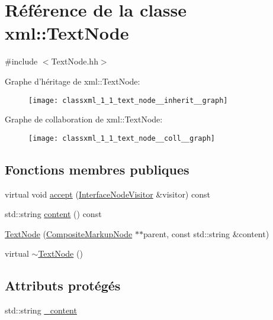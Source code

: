 \hypertarget{classxml_1_1_text_node}{
\section{Référence de la classe xml::TextNode}
\label{classxml_1_1_text_node}
}


{\ttfamily \#include $<$TextNode.hh$>$}



Graphe d'héritage de xml::TextNode:\nopagebreak
\begin{figure}[H]
\begin{center}
\leavevmode
\texttt{[image: classxml\_1\_1\_text\_node\_\_inherit\_\_graph]}
\end{center}
\end{figure}


Graphe de collaboration de xml::TextNode:\nopagebreak
\begin{figure}[H]
\begin{center}
\leavevmode
\texttt{[image: classxml\_1\_1\_text\_node\_\_coll\_\_graph]}
\end{center}
\end{figure}
\subsection*{Fonctions membres publiques}
\begin{DoxyCompactItemize}
\item 
virtual void \hyperlink{classxml_1_1_text_node_ac918f8f74e141690e18cd8e23d174996}{accept} (\hyperlink{classxml_1_1_interface_node_visitor}{InterfaceNodeVisitor} \&visitor) const 
\item 
std::string \hyperlink{classxml_1_1_text_node_a25941b48615a65258cc17d85bc0691d1}{content} () const 
\item 
\hyperlink{classxml_1_1_text_node_aa792bfa28288ba0b52f38215acb1feb0}{TextNode} (\hyperlink{classxml_1_1_composite_markup_node}{CompositeMarkupNode} $\ast$$\ast$parent, const std::string \&content)
\item 
virtual \hyperlink{classxml_1_1_text_node_a631efcd9de6889ba2b8f31e578267d29}{$\sim$TextNode} ()
\end{DoxyCompactItemize}
\subsection*{Attributs protégés}
\begin{DoxyCompactItemize}
\item 
std::string \hyperlink{classxml_1_1_text_node_a1c237e716b3f9fd76569d443d838cd25}{\_\-content}
\end{DoxyCompactItemize}



